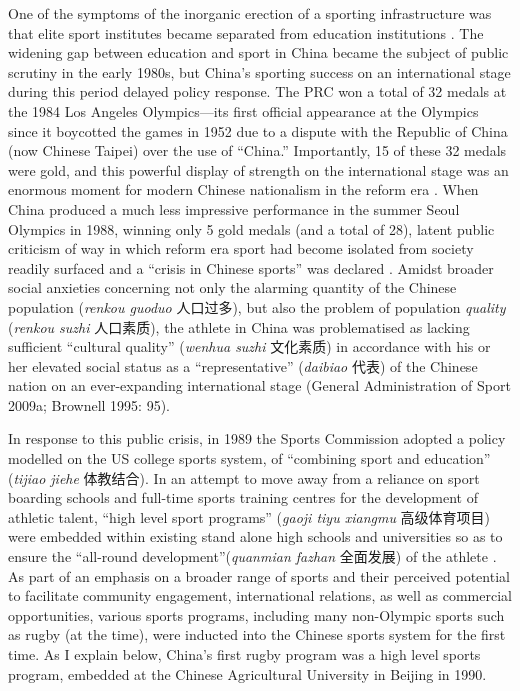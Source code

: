 \begin{CJK}{UTF8}{gbsn}
 One of the symptoms of the inorganic erection of a sporting infrastructure was that elite sport institutes became separated from education institutions \citep{Brownell2008}.  The widening gap between education and sport in China became the subject of public scrutiny in the early 1980s, but China's sporting success on an international stage during this period delayed policy response.  The PRC won a total of 32 medals at the 1984 Los Angeles Olympics---its first official appearance at the Olympics since it boycotted the games in 1952 due to a dispute with the Republic of China (now Chinese Taipei) over the use of ``China.''  Importantly, 15 of these 32 medals were gold, and this powerful display of strength on the international stage was an enormous moment for modern Chinese nationalism in the reform era \citep{Brownell2008}.  When China produced a much less impressive performance in the summer Seoul Olympics in 1988, winning only 5 gold medals (and a total of 28), latent public criticism of way in which reform era sport had become isolated from society readily surfaced and a ``crisis in Chinese sports'' was declared \citep[199]{Brownell1995}.  Amidst broader social anxieties concerning not only the alarming quantity of the Chinese population (\textit{renkou guoduo} 人口过多), but also the problem of population \textit{quality} (\textit{renkou suzhi} 人口素质), the athlete in China was problematised as lacking sufficient ``cultural quality'' (\textit{wenhua suzhi} 文化素质) in accordance with his or her elevated social status as a ``representative'' (\textit{daibiao} 代表) of the Chinese nation on an ever-expanding international stage (General Administration of Sport 2009a; Brownell 1995: 95).

 In response to this public crisis, in 1989 the Sports Commission adopted a policy modelled on the US college sports system, of ``combining sport and education'' (\textit{tijiao jiehe} 体教结合).  In an attempt to move away from a reliance on sport boarding schools and full-time sports training centres for the development of athletic talent, ``high level sport programs'' (\textit{gaoji tiyu xiangmu} 高级体育项目) were embedded within existing stand alone high schools and universities so as to ensure the ``all-round development''(\textit{quanmian fazhan} 全面发展) of the athlete \citep[203]{Brownell1995}.  As part of an emphasis on a broader range of sports and their perceived potential to facilitate community engagement, international relations, as well as commercial opportunities, various sports programs, including many non-Olympic sports such as rugby (at the time), were inducted into the Chinese sports system for the first time\citep[70]{Knuttgen1990}.  As I explain below, China's first rugby program was a high level sports program, embedded at the Chinese Agricultural University in Beijing in 1990.


\end{CJK}
